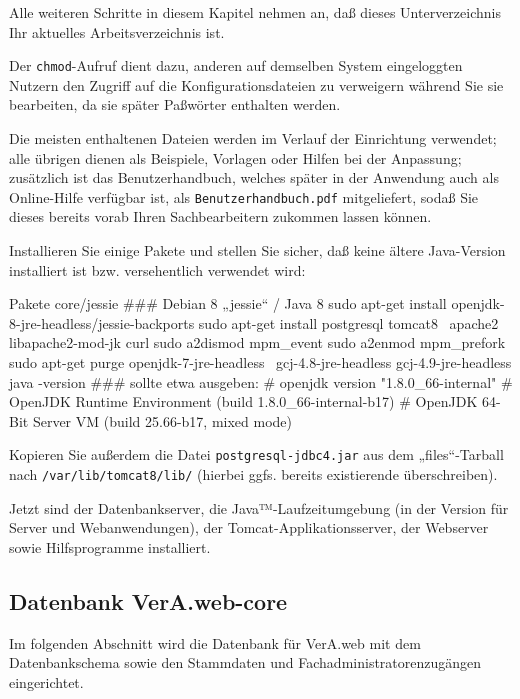 Alle weiteren Schritte in diesem Kapitel nehmen an, daß dieses
Unterverzeichnis Ihr aktuelles Arbeitsverzeichnis ist.

Der \texttt{chmod}-Aufruf dient dazu, anderen auf demselben System
eingeloggten Nutzern den Zugriff auf die Konfigurationsdateien zu
verweigern während Sie sie bearbeiten, da sie später Paßwörter
enthalten werden.

Die meisten enthaltenen Dateien werden im Verlauf der Einrichtung
verwendet; alle übrigen dienen als Beispiele, Vorlagen oder Hilfen
bei der Anpassung; zusätzlich ist das Benutzerhandbuch, welches
später in der Anwendung auch als Online-Hilfe verfügbar ist, als
\texttt{Benutzerhandbuch.pdf} mitgeliefert, sodaß Sie dieses bereits
vorab Ihren Sachbearbeitern zukommen lassen können.

\begin{minipage}{\linewidth}
Installieren Sie einige Pakete und stellen Sie sicher, daß keine
ältere Java-Version installiert ist bzw. versehentlich verwendet wird:


\begin{lstdump}{Pakete core/jessie}
### Debian 8 „jessie“ / Java 8
sudo apt-get install openjdk-8-jre-headless/jessie-backports
sudo apt-get install postgresql tomcat8 \
    apache2 libapache2-mod-jk curl
sudo a2dismod mpm_event
sudo a2enmod mpm_prefork
sudo apt-get purge openjdk-7-jre-headless \
    gcj-4.8-jre-headless gcj-4.9-jre-headless
java -version
### sollte etwa ausgeben:
# openjdk version "1.8.0_66-internal"
# OpenJDK Runtime Environment (build 1.8.0_66-internal-b17)
# OpenJDK 64-Bit Server VM (build 25.66-b17, mixed mode)
\end{lstdump}
\end{minipage}

Kopieren Sie außerdem die Datei \texttt{postgresql-jdbc4.jar} aus
dem „files“-Tarball nach \texttt{/var/lib/tomcat8/lib/} (hierbei
ggfs. bereits existierende überschreiben).

Jetzt sind der Datenbankserver, die Java™-Laufzeitumgebung (in der
Version für Server und Webanwendungen), der Tomcat-Applikationsserver,
der Webserver sowie Hilfsprogramme installiert.

\subsection{Datenbank VerA.web-core}\label{subsec:setup-core-db}

Im folgenden Abschnitt wird die Datenbank für VerA.web mit dem
Datenbankschema sowie den Stammdaten und Fachadministratorenzugängen
eingerichtet.

